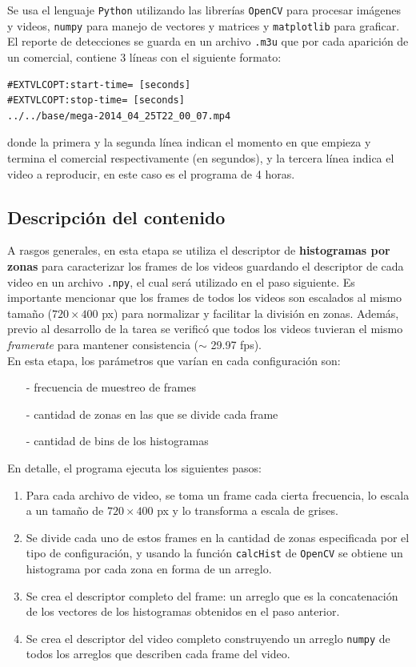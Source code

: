 \documentclass[14pt,letterpaper,hidelinks]{extarticle}
\begin{document}
Se usa el lenguaje \verb+Python+ utilizando las librerías \verb+OpenCV+ para procesar imágenes y videos, \verb+numpy+ para manejo de vectores y matrices y \verb+matplotlib+ para graficar.\\

El reporte de detecciones se guarda en un archivo \verb+.m3u+ que por cada aparición de un comercial, contiene 3 líneas con el siguiente formato: 
\begin{verbatim}
#EXTVLCOPT:start-time= [seconds]
#EXTVLCOPT:stop-time= [seconds]
../../base/mega-2014_04_25T22_00_07.mp4
\end{verbatim}
donde la primera y la segunda línea indican el momento en que empieza y termina el comercial respectivamente (en segundos), y la tercera línea indica el video a reproducir, en este caso es el programa de 4 horas.\\

\subsection{Descripción del contenido}
A rasgos generales, en esta etapa se utiliza el descriptor de \textbf{histogramas por zonas} para caracterizar los frames de los videos guardando el descriptor de cada video en un archivo \verb+.npy+, el cual será utilizado en el paso siguiente. Es importante mencionar que los frames de todos los videos son escalados al mismo tamaño ($720\times400$ px) para normalizar y facilitar la división en zonas. Además, previo al desarrollo de la tarea se verificó que todos los videos tuvieran el mismo \textit{framerate} para mantener consistencia ($\sim$ 29.97 fps).\\

En esta etapa, los parámetros que varían en cada configuración son:
\begin{itemize}
\item[-] frecuencia de muestreo de frames
\item[-] cantidad de zonas en las que se divide cada frame
\item[-] cantidad de bins de los histogramas 
\end{itemize}

En detalle, el programa ejecuta los siguientes pasos:
\begin{enumerate}
\item Para cada archivo de video, se toma un frame cada cierta frecuencia, lo escala a un tamaño de $720\times400$ px y lo transforma a escala de grises.
\item Se divide cada uno de estos frames en la cantidad de zonas especificada por el tipo de configuración, y usando la función \verb+calcHist+ de \verb+OpenCV+ se obtiene un histograma por cada zona en forma de un arreglo.
\item Se crea el descriptor completo del frame: un arreglo que es la concatenación de los vectores de los histogramas obtenidos en el paso anterior.
\item Se crea el descriptor del video completo construyendo un arreglo \verb+numpy+ de todos los arreglos que describen cada frame del video.
\end{enumerate}
\end{document}
